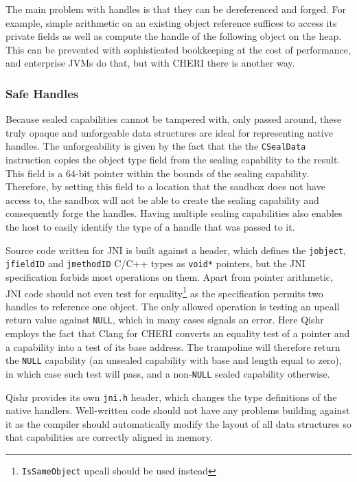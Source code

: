\documentclass[a4paper,12pt,twoside,openright]{report}
\newcommand{\insn}[1]{\texttt{#1}}
\begin{document}
The main problem with handles is that they can be dereferenced and forged. For example, simple arithmetic on an existing object reference suffices to access its private fields as well as compute the handle of the following object on the heap. This can be prevented with sophisticated bookkeeping at the cost of performance, and enterprise JVMs do that, but with CHERI there is another way. 

\subsubsection{Safe Handles}

Because sealed capabilities cannot be tampered with, only passed around, these truly opaque and unforgeable data structures are ideal for representing native handles. The unforgeability is given by the fact that the the \insn{CSealData} instruction copies the object type field from the sealing capability to the result. This field is a 64-bit pointer within the bounds of the sealing capability. Therefore, by setting this field to a location that the sandbox does not have access to, the sandbox will not be able to create the sealing capability and consequently forge the handles. Having multiple sealing capabilities also enables the host to easily identify the type of a handle that was passed to it.

Source code written for JNI is built against a header, which defines the \texttt{jobject}, \texttt{jfieldID} and \texttt{jmethodID} C/C++ types as \texttt{void*} pointers, but the JNI specification forbids most operations on them. Apart from pointer arithmetic, JNI code should not even test for equality\footnote{\texttt{IsSameObject} upcall should be used instead} as the specification permits two handles to reference one object. The only allowed operation is testing an upcall return value against \texttt{NULL}, which in many cases signals an error. Here Qishr employs the fact that Clang for CHERI converts an equality test of a pointer and a capability into a test of its base address. The trampoline will therefore return the \texttt{NULL} capability (an unsealed capability with base and length equal to zero), in which case such test will pass, and a non-\texttt{NULL} sealed capability otherwise. 

Qishr provides its own \texttt{jni.h} header, which changes the type definitions of the native handlers. Well-written code should not have any problems building against it as the compiler should automatically modify the layout of all data structures so that capabilities are correctly aligned in memory.
\end{document}
